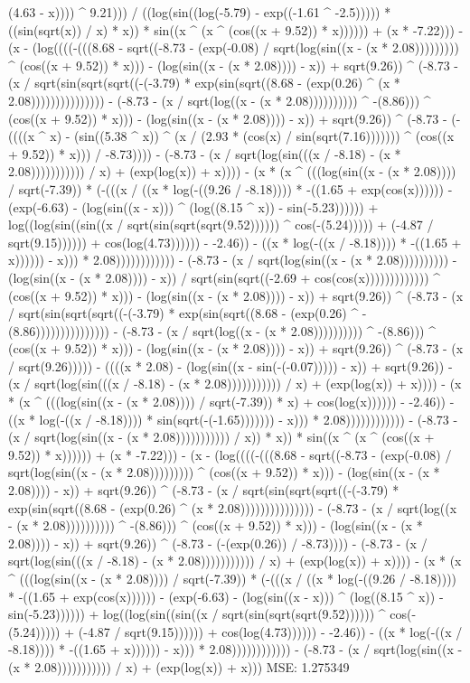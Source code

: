 (4.63 - x)))) ^ 9.21))) / ((log(sin((log(-5.79) - exp((-1.61 ^ -2.5))))) * ((sin(sqrt(x)) / x) * x)) * sin((x ^ (x ^ (cos((x + 9.52)) * x)))))) + (x * -7.22))) - (x - (log((((-(((8.68 - sqrt((-8.73 - (exp(-0.08) / sqrt(log(sin((x - (x * 2.08))))))))) ^ (cos((x + 9.52)) * x))) - (log(sin((x - (x * 2.08)))) - x)) + sqrt(9.26)) ^ (-8.73 - (x / sqrt(sin(sqrt(sqrt((-(-3.79) * exp(sin(sqrt((8.68 - (exp(0.26) ^ (x * 2.08))))))))))))))) - (-8.73 - (x / sqrt(log((x - (x * 2.08)))))))))) ^ -(8.86))) ^ (cos((x + 9.52)) * x))) - (log(sin((x - (x * 2.08)))) - x)) + sqrt(9.26)) ^ (-8.73 - (-((((x ^ x) - (sin((5.38 ^ x)) ^ (x / (2.93 * (cos(x) / sin(sqrt(7.16))))))) ^ (cos((x + 9.52)) * x))) / -8.73)))) - (-8.73 - (x / sqrt(log(sin(((x / -8.18) - (x * 2.08))))))))))) / x) + (exp(log(x)) + x)))) - (x * (x ^ (((log(sin((x - (x * 2.08)))) / sqrt(-7.39)) * (-(((x / ((x * log(-((9.26 / -8.18)))) * -((1.65 + exp(cos(x)))))) - (exp(-6.63) - (log(sin((x - x))) ^ (log((8.15 ^ x)) - sin(-5.23)))))) + log((log(sin((sin((x / sqrt(sin(sqrt(sqrt(9.52)))))) ^ cos(-(5.24))))) + (-4.87 / sqrt(9.15)))))) + cos(log(4.73)))))) - -2.46)) - ((x * log(-((x / -8.18)))) * -((1.65 + x)))))) - x))) * 2.08)))))))))))) - (-8.73 - (x / sqrt(log(sin((x - (x * 2.08)))))))))) - (log(sin((x - (x * 2.08)))) - x)) / sqrt(sin(sqrt((-2.69 + cos(cos(x))))))))))))) ^ (cos((x + 9.52)) * x))) - (log(sin((x - (x * 2.08)))) - x)) + sqrt(9.26)) ^ (-8.73 - (x / sqrt(sin(sqrt(sqrt((-(-3.79) * exp(sin(sqrt((8.68 - (exp(0.26) ^ -(8.86))))))))))))))) - (-8.73 - (x / sqrt(log((x - (x * 2.08)))))))))) ^ -(8.86))) ^ (cos((x + 9.52)) * x))) - (log(sin((x - (x * 2.08)))) - x)) + sqrt(9.26)) ^ (-8.73 - (x / sqrt(9.26))))) - ((((x * 2.08) - (log(sin((x - sin(-(-0.07))))) - x)) + sqrt(9.26)) - (x / sqrt(log(sin(((x / -8.18) - (x * 2.08))))))))))) / x) + (exp(log(x)) + x)))) - (x * (x ^ (((log(sin((x - (x * 2.08)))) / sqrt(-7.39)) * x) + cos(log(x)))))) - -2.46)) - ((x * log(-((x / -8.18)))) * sin(sqrt(-(-1.65))))))) - x))) * 2.08)))))))))))) - (-8.73 - (x / sqrt(log(sin((x - (x * 2.08))))))))))) / x)) * x)) * sin((x ^ (x ^ (cos((x + 9.52)) * x)))))) + (x * -7.22))) - (x - (log((((-(((8.68 - sqrt((-8.73 - (exp(-0.08) / sqrt(log(sin((x - (x * 2.08))))))))) ^ (cos((x + 9.52)) * x))) - (log(sin((x - (x * 2.08)))) - x)) + sqrt(9.26)) ^ (-8.73 - (x / sqrt(sin(sqrt(sqrt((-(-3.79) * exp(sin(sqrt((8.68 - (exp(0.26) ^ (x * 2.08))))))))))))))) - (-8.73 - (x / sqrt(log((x - (x * 2.08)))))))))) ^ -(8.86))) ^ (cos((x + 9.52)) * x))) - (log(sin((x - (x * 2.08)))) - x)) + sqrt(9.26)) ^ (-8.73 - (-(exp(0.26)) / -8.73)))) - (-8.73 - (x / sqrt(log(sin(((x / -8.18) - (x * 2.08))))))))))) / x) + (exp(log(x)) + x)))) - (x * (x ^ (((log(sin((x - (x * 2.08)))) / sqrt(-7.39)) * (-(((x / ((x * log(-((9.26 / -8.18)))) * -((1.65 + exp(cos(x)))))) - (exp(-6.63) - (log(sin((x - x))) ^ (log((8.15 ^ x)) - sin(-5.23)))))) + log((log(sin((sin((x / sqrt(sin(sqrt(sqrt(9.52)))))) ^ cos(-(5.24))))) + (-4.87 / sqrt(9.15)))))) + cos(log(4.73)))))) - -2.46)) - ((x * log(-((x / -8.18)))) * -((1.65 + x)))))) - x))) * 2.08)))))))))))) - (-8.73 - (x / sqrt(log(sin((x - (x * 2.08))))))))))) / x) + (exp(log(x)) + x)))
MSE: 1.275349
